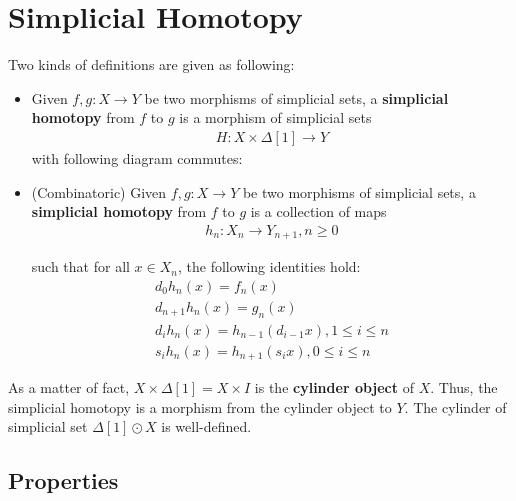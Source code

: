 \documentclass[Total.tex]{subfiles}
\begin{document}
		\section{Simplicial Homotopy}
		\begin{Def} Two kinds of definitions are given as following:
			\begin{itemize}
				\item Given $f,g:X\rightarrow Y$ be two morphisms of simplicial sets, a \textbf{simplicial homotopy} from $f$ to $g$ is a morphism of simplicial sets
				\begin{gather*}
					H:X\times \Delta[1]\rightarrow Y
				\end{gather*}
				with following diagram commutes:
				\begin{center}
					\end{center}
					
					\item (Combinatoric) Given $f,g:X\rightarrow Y$ be two morphisms of simplicial sets, a \textbf{simplicial homotopy} from $f$ to $g$ is a collection of maps
					\begin{gather*}
						h_n:X_n\rightarrow Y_{n+1},n\geq 0
					\end{gather*}
					
					such that for all $x\in X_n$, the following identities hold:
					\begin{gather*}
						d_0h_n(x)=f_n(x)\\
						d_{n+1}h_n(x)=g_n(x)\\
						d_ih_n(x)=h_{n-1}(d_{i-1}x),1\leq i\leq n\\
						s_ih_n(x)=h_{n+1}(s_ix),0\leq i\leq n
					\end{gather*}
			\end{itemize}
		\end{Def}
		
		As a matter of fact, $X\times \Delta[1]=X\times I$ is the \textbf{cylinder object} of $X$. 
		Thus, the simplicial homotopy is a morphism from the cylinder object to $Y$. The cylinder of simplicial set $\Delta[1]\odot X$ is well-defined.

		\subsection{Properties}
\end{document}
